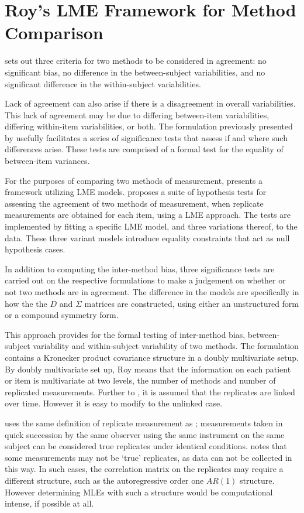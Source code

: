 \documentclass[12pt, a4paper]{report}
\theoremstyle{plain}
\theoremstyle{definition}
\theoremstyle{remark}
\begin{document}
	
	
	\section{Roy's LME Framework for Method Comparison }
	\citet{Barnhart} sets out three criteria for two methods to be considered in agreement: no significant bias, no difference in the between-subject variabilities, and no significant difference in the within-subject variabilities.
	
	
	Lack of agreement can also arise if there is a disagreement in overall variabilities. This lack of agreement may be due to differing between-item variabilities, differing within-item variabilities, or both. The formulation previously presented by \citet{ARoy2009} usefully facilitates a series of significance tests that assess if and where such differences arise. These tests are comprised of a formal test for the equality of between-item variances.

	
	For the purposes of comparing two methods of measurement, \citet{ARoy2009} presents a framework utilizing LME models. \citet{ARoy2009} proposes a suite of hypothesis tests for assessing the agreement of two methods of measurement, when replicate measurements are obtained for each item, using a LME approach. The tests are implemented by fitting a specific LME model, and three variations thereof, to the data. These three variant models introduce equality constraints that act as null hypothesis cases.
	
	In addition to computing the inter-method bias, three significance tests are carried out on the respective formulations to make a judgement on whether or not two methods are in agreement. The difference in the models are specifically in how the the $D$ and $\Sigma$ matrices are constructed, using either an unstructured form or a compound symmetry form.
	
This approach provides for the formal testing of inter-method bias, between-subject variability and within-subject variability of two methods. The formulation contains a Kronecker product covariance structure in a doubly multivariate setup. By doubly multivariate set up, Roy means that the information on each patient or item is multivariate at two levels, the number of methods and number of replicated measurements. Further to \citet{lam}, it is assumed that the replicates are linked over time. However it is easy to modify to the unlinked case.

\citet{ARoy2009} uses the same definition of replicate measurement as \citet{BA99}; measurements taken in quick succession by the same observer using the same instrument on the same subject can be considered true replicates under identical conditions.
\citet{ARoy2009} notes that some measurements may not be `true' replicates, as data can not be collected in this way. In such cases, the correlation matrix on the replicates may require a different structure, such as the autoregressive order one $AR(1)$ structure. However determining MLEs with such a structure would be computational intense, if possible at all.
	
\end{document}
